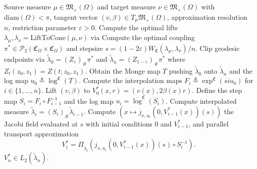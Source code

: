 \documentclass[11pt]{article}
\begin{document}
\begin{algorithm}[H]
    \begin{algorithmic}[1]
        \caption{Approximate Parallel transport on $(\mathfrak{M}_+(\Omega), \text{HK})$}
        \label{alg: HK parallel transport}
        \Require Source measure $\mu \in \mathfrak{M}_+(\Omega)$ and target measure $\nu \in \mathfrak{M}_+(\Omega)$ with $\text{diam}(\Omega) < \pi$, tangent vector $(v, \beta) \in T_{\mu}\mathfrak{M}_+(\Omega)$, approximation resolution $n$, restriction parameter $\varepsilon >0$.  
        \State Compute the optimal lifts $\lambda_{\mu}, \lambda_{\nu} = \text{LiftToCone}(\mu, \nu)$ via 
        \State Compute the optimal coupling $\pi^* \in \mathcal{P}_2(\mathfrak{C}_{\Omega} \times \mathfrak{C}_{\Omega})$ and stepsize $s = (1-2\varepsilon)W_\mathfrak{C}(\lambda_\mu, \lambda_\nu)/n.$
        \State Clip geodesic endpoints via $\tilde{\lambda}_0 = (Z_{\varepsilon})_{\#}\pi^*$ and $\tilde{\lambda}_n = (Z_{1 - \varepsilon})_{\#}\pi^*$ where $Z_t(z_0, z_1) = Z(t; z_0, z_1)$. 
        \State Obtain the Monge map $T$ pushing $\tilde \lambda_0$ onto $\tilde \lambda_n$ and the log map $u_0 \triangleq \log^{\mathfrak{C}}(T)$.
        \State Compute the interpolation maps $F_i \triangleq \exp^{\mathfrak{C}}(si u_0)$ for $i \in \{1, \dots, n\}$.
        \State Lift $(v, \beta)$ to $V^*_0(x,r) = \left(v(x), 2\beta(x)r\right)$. 
            \State Define the step map $S_i = F_{i} \circ F_{i-1}^{-1}$ and the log map $u_i = \overline{\log}^\mathfrak{C}(S_i)$.
            \State Compute interpolated measure $\tilde{\lambda}_i = (S_i)_\#\tilde \lambda_{i-1}$.
            \State Compute $\left(x \mapsto j_{x, u_i}(0, V_{i-1}^*(x))(s)\right)$ the Jacobi field evaluated at $s$ with initial conditions $0$ and $V^*_{i-1}$, \hspace*{\algorithmicindent}and parallel transport approximation
            \[V_{i}^* = \Pi_{\tilde\lambda_i}\left(j_{x, u_i}(0, V_{i-1}^*(x))(s) \circ S_i^{-1}\right).\]
        \EndFor
        \State \Return $V^*_{n} \in L_2(\tilde\lambda_n)$. 
    \end{algorithmic}
\end{algorithm}

\end{document}
